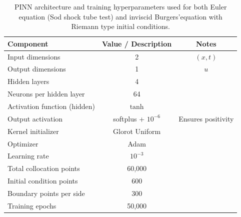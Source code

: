 \documentclass{article} %
\theoremstyle{plain}
\begin{document}
\begin{table}[h]
\centering
\renewcommand{\arraystretch}{1.25}
\small
\caption{PINN architecture and training hyperparameters used for both Euler equation (Sod shock tube test) and inviscid Burgers'equation with Riemann type initial conditions.}
\begin{tabular}{lcc}
\hline
\textbf{Component} & \textbf{Value / Description} & \textbf{Notes} \\
\hline
Input dimensions & 2 & $(x, t)$ \\
Output dimensions & 1  & $u$ \\
Hidden layers & 4 & \\
Neurons per hidden layer & 64 & \\
Activation function (hidden) & $\tanh$ & \\
Output activation & softplus + $10^{-6}$ & Ensures positivity \\
Kernel initializer & Glorot Uniform & \\
Optimizer & Adam & \\
Learning rate & $10^{-3}$ & \\
Total collocation points & 60,000 & \\
Initial condition points & 600 & \\
Boundary points per side & 300 & \\
Training epochs & 50,000 & \\
\hline
\end{tabular}
\label{tab:pinn_architecture}
\end{table}
\end{document}
